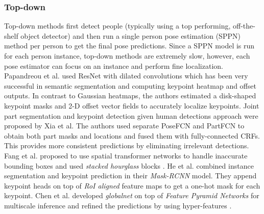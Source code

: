 \documentclass[runningheads]{llncs}
\begin{document}
\subsubsection{Top-down}


Top-down methods first detect people (typically using a top performing, off-the-shelf object detector) and then run a single person pose estimation (SPPN) method per person to get the final pose predictions. Since a SPPN model is run for each person instance, top-down methods are extremely slow, however, each pose estimator can focus on an instance and perform fine localization. Papandreou et al.\cite{Papandreou2017} used ResNet with dilated convolutions \cite{He2016} which has been very successful in semantic segmentation \cite{Chen2016} and computing keypoint heatmap and offset outputs. In contrast to Gaussian heatmaps, the authors estimated a disk-shaped keypoint masks and 2-D offset vector fields to accurately localize keypoints. Joint part segmentation and keypoint detection given human detections approach were proposed by Xia et al.\cite{Xia} The authors used separate PoseFCN and PartFCN to obtain both part masks and locations and fused them with fully-connected CRFs. This provides more consistent predictions by eliminating irrelevant detections. Fang et al.\cite{Fang2017} proposed to use spatial transformer networks to handle inaccurate bounding boxes and used \textit{stacked hourglass} blocks \cite{Newella}. He et al.\cite{He2017a} combined instance segmentation and keypoint prediction in their \textit{Mask-RCNN} model. They append keypoint heads on top of \textit{RoI aligned} feature maps to get  a one-hot mask for each keypoint. Chen et al.\cite{Chen2017a} developed \textit{globalnet} on top of \textit{Feature Pyramid Networks} \cite{Lina} for multiscale inference and refined the predictions by using hyper-features \cite{Kong}.
\end{document}
